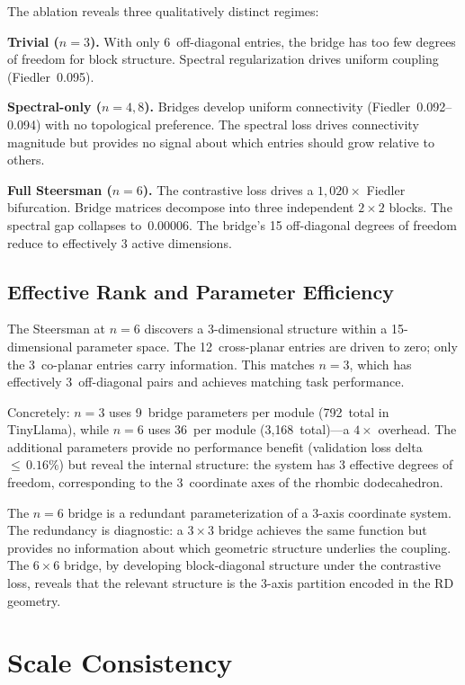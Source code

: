 \documentclass[11pt]{article}
\begin{document}
The ablation reveals three qualitatively distinct regimes:

\textbf{Trivial ($n = 3$).} With only 6~off-diagonal entries,
the bridge has too few degrees of freedom for block structure.
Spectral regularization drives uniform coupling
(Fiedler~0.095).

\textbf{Spectral-only ($n = 4, 8$).} Bridges develop uniform
connectivity (Fiedler~0.092--0.094) with no topological preference.
The spectral loss drives connectivity magnitude but provides no
signal about which entries should grow relative to others.

\textbf{Full Steersman ($n = 6$).} The contrastive loss drives a
$1{,}020\times$ Fiedler bifurcation. Bridge matrices decompose into
three independent $2 \times 2$ blocks. The spectral gap collapses
to~0.00006. The bridge's 15 off-diagonal degrees of freedom reduce
to effectively 3 active dimensions.

\subsection{Effective Rank and Parameter Efficiency}

The Steersman at $n = 6$ discovers a 3-dimensional structure within a
15-dimensional parameter space. The 12~cross-planar entries are driven
to zero; only the 3~co-planar entries carry information. This matches
$n = 3$, which has effectively 3~off-diagonal pairs and achieves
matching task performance.

Concretely: $n = 3$ uses 9~bridge parameters per module (792~total
in TinyLlama), while $n = 6$ uses 36~per module (3{,}168~total)---a
$4\times$ overhead. The additional parameters provide no performance
benefit (validation loss delta ${\leq}\,0.16\%$) but reveal the
internal structure: the system has 3 effective degrees of freedom,
corresponding to the 3~coordinate axes of the rhombic dodecahedron.

The $n = 6$ bridge is a redundant parameterization of a 3-axis
coordinate system. The redundancy is diagnostic: a $3 \times 3$ bridge
achieves the same function but provides no information about which
geometric structure underlies the coupling. The $6 \times 6$ bridge,
by developing block-diagonal structure under the contrastive loss,
reveals that the relevant structure is the 3-axis partition encoded in
the RD geometry.


\section{Scale Consistency}
\label{sec:scale}
\end{document}
